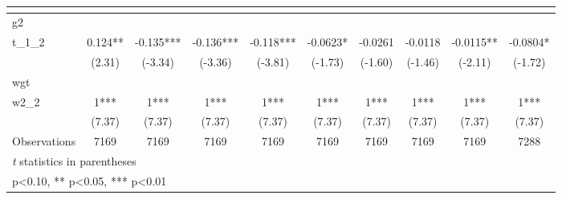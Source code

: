 \begin{table}[htbp]\centering
\def\sym#1{\ifmmode^{#1}\else\(^{#1}\)\fi}
\caption{ \label{tab1}}
\begin{tabular}{l*{9}{c}}
\toprule
                    &\multicolumn{1}{c}{}&\multicolumn{1}{c}{}&\multicolumn{1}{c}{}&\multicolumn{1}{c}{}&\multicolumn{1}{c}{}&\multicolumn{1}{c}{}&\multicolumn{1}{c}{}&\multicolumn{1}{c}{}&\multicolumn{1}{c}{}\\
\midrule
g2                  &               &               &               &               &               &               &               &               &               \\
t\_1\_2               &       0.124** &      -0.135***&      -0.136***&      -0.118***&     -0.0623*  &     -0.0261   &     -0.0118   &     -0.0115** &     -0.0804*  \\
                    &      (2.31)   &     (-3.34)   &     (-3.36)   &     (-3.81)   &     (-1.73)   &     (-1.60)   &     (-1.46)   &     (-2.11)   &     (-1.72)   \\
\midrule
wgt                 &               &               &               &               &               &               &               &               &               \\
w2\_2                &           1***&           1***&           1***&           1***&           1***&           1***&           1***&           1***&           1***\\
                    &      (7.37)   &      (7.37)   &      (7.37)   &      (7.37)   &      (7.37)   &      (7.37)   &      (7.37)   &      (7.37)   &      (7.37)   \\
\midrule
Observations        &        7169   &        7169   &        7169   &        7169   &        7169   &        7169   &        7169   &        7169   &        7288   \\
\bottomrule
\multicolumn{10}{l}{\footnotesize \textit{t} statistics in parentheses}\\
\multicolumn{10}{l}{\footnotesize * p<0.10, ** p<0.05, *** p<0.01}\\
\end{tabular}
\end{table}

